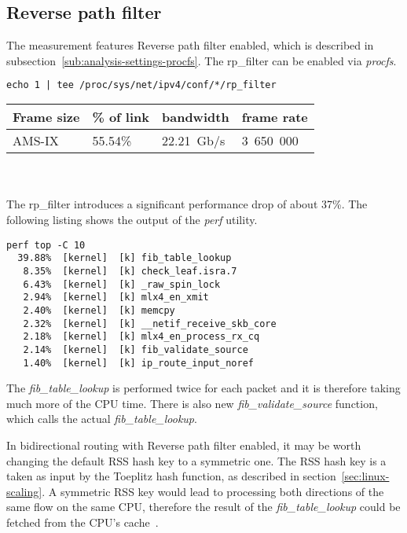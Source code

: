 
\subsection{Reverse path filter}
The measurement features Reverse path filter enabled, which is described in subsection~\ref{sub:analysis-settings-procfs}.
The rp\_filter can be enabled via {\it{procfs}}.
\begin{lstlisting}[language=TeX]
echo 1 | tee /proc/sys/net/ipv4/conf/*/rp_filter
\end{lstlisting}

\begin{tabular}{ | l | l | l | l | }
\hline
Frame size & \% of link & bandwidth & frame rate \\
\hline
AMS-IX & 55.54\% & 22.21~Gb/s & 3~650~000 \\
\hline
\end{tabular}
\\
\\
The rp\_filter introduces a significant performance drop of about 37\%.
The following listing shows the output of the {\it{perf}} utility.
\begin{lstlisting}
perf top -C 10
  39.88%  [kernel]  [k] fib_table_lookup
   8.35%  [kernel]  [k] check_leaf.isra.7
   6.43%  [kernel]  [k] _raw_spin_lock
   2.94%  [kernel]  [k] mlx4_en_xmit
   2.40%  [kernel]  [k] memcpy
   2.32%  [kernel]  [k] __netif_receive_skb_core
   2.18%  [kernel]  [k] mlx4_en_process_rx_cq
   2.14%  [kernel]  [k] fib_validate_source
   1.40%  [kernel]  [k] ip_route_input_noref
\end{lstlisting}
The {\it{fib\_table\_lookup}} is performed twice for each packet
and it is therefore taking much more of the CPU time.
There is also new {\it{fib\_validate\_source}} function, which calls
the actual {\it{fib\_table\_lookup}}.

In bidirectional routing with Reverse path filter enabled,
it may be worth changing the default RSS hash key to a symmetric one.
The RSS hash key is a taken as input by the Toeplitz hash function, as described in section~\ref{sec:linux-scaling}.
A symmetric RSS key would lead to processing both directions of the same flow on the same CPU,
therefore the result of the {\it{fib\_table\_lookup}} could be fetched from the CPU's cache~\cite{symetric-rss}.
